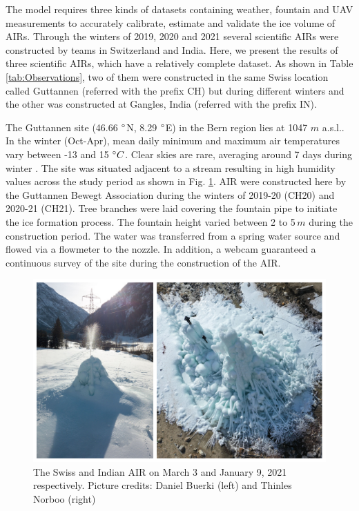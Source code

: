 \documentclass[utf8]{frontiersSCNS} %
\begin{document}
The model requires three kinds of datasets containing weather, fountain and UAV measurements to accurately
calibrate, estimate and validate the ice volume of AIRs. Through the winters of 2019, 2020 and 2021 several
scientific AIRs were constructed by teams in Switzerland and India. Here, we present the results of three
scientific AIRs, which have a relatively complete dataset. As shown in Table \ref{tab:Observations}, two of them
were constructed in the same Swiss location called Guttannen (referred with the prefix CH) but during different
winters and the other was constructed at Gangles, India (referred with the prefix IN).

The Guttannen site (46.66 $\degree$N, 8.29 $\degree$E) in the Bern region lies at 1047 $m$ a.s.l.. In the winter
(Oct-Apr), mean daily minimum and maximum air temperatures vary between -13 and 15 $\degree C$. Clear skies are
rare, averaging around 7 days during winter \citep{guttannen}. The site was situated adjacent to a stream
resulting in high humidity values across the study period as shown in Fig. \ref{fig:2AIR}. AIR were constructed
here by the Guttannen Bewegt Association during the winters of 2019-20 (CH20) and 2020-21 (CH21). Tree branches
were laid covering the fountain pipe to initiate the ice formation process. The fountain height varied between 2
to 5\,$m$ during the construction period. The water was transferred from a spring water source and flowed via a
flowmeter to the nozzle. In addition, a webcam guaranteed a continuous survey of the site during the
construction of the AIR.

\begin{figure}
	\begin{center}
		\includegraphics[width=12 cm]{Figures/Figure_2.jpg}
	\end{center}
	\caption{The Swiss and Indian AIR on March 3 and January 9, 2021 respectively. Picture credits: Daniel Buerki (left)
		and Thinles Norboo (right)}
	\label{fig:2AIR}
\end{figure}
\end{document}
